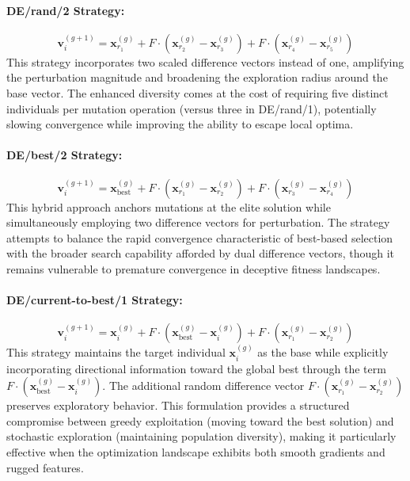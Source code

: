 \documentclass[12pt,a4paper]{report}
\begin{document}
\paragraph{DE/rand/2 Strategy:}
\begin{equation}
\mathbf{v}_i^{(g+1)} = \mathbf{x}_{r_1}^{(g)} + F \cdot \left( \mathbf{x}_{r_2}^{(g)} - \mathbf{x}_{r_3}^{(g)} \right) + F \cdot \left( \mathbf{x}_{r_4}^{(g)} - \mathbf{x}_{r_5}^{(g)} \right)
\end{equation}
This strategy incorporates two scaled difference vectors instead of one, amplifying the perturbation magnitude and broadening the exploration radius around the base vector. The enhanced diversity comes at the cost of requiring five distinct individuals per mutation operation (versus three in DE/rand/1), potentially slowing convergence while improving the ability to escape local optima.

\paragraph{DE/best/2 Strategy:}
\begin{equation}
\mathbf{v}_i^{(g+1)} = \mathbf{x}_{\text{best}}^{(g)} + F \cdot \left( \mathbf{x}_{r_1}^{(g)} - \mathbf{x}_{r_2}^{(g)} \right) + F \cdot \left( \mathbf{x}_{r_3}^{(g)} - \mathbf{x}_{r_4}^{(g)} \right)
\end{equation}
This hybrid approach anchors mutations at the elite solution while simultaneously employing two difference vectors for perturbation. The strategy attempts to balance the rapid convergence characteristic of best-based selection with the broader search capability afforded by dual difference vectors, though it remains vulnerable to premature convergence in deceptive fitness landscapes.

\paragraph{DE/current-to-best/1 Strategy:}
\begin{equation}
\mathbf{v}_i^{(g+1)} = \mathbf{x}_i^{(g)} + F \cdot \left( \mathbf{x}_{\text{best}}^{(g)} - \mathbf{x}_i^{(g)} \right) + F \cdot \left( \mathbf{x}_{r_1}^{(g)} - \mathbf{x}_{r_2}^{(g)} \right)
\end{equation}
This strategy maintains the target individual $\mathbf{x}_i^{(g)}$ as the base while explicitly incorporating directional information toward the global best through the term $F \cdot (\mathbf{x}_{\text{best}}^{(g)} - \mathbf{x}_i^{(g)})$. The additional random difference vector $F \cdot (\mathbf{x}_{r_1}^{(g)} - \mathbf{x}_{r_2}^{(g)})$ preserves exploratory behavior. This formulation provides a structured compromise between greedy exploitation (moving toward the best solution) and stochastic exploration (maintaining population diversity), making it particularly effective when the optimization landscape exhibits both smooth gradients and rugged features.
\end{document}
